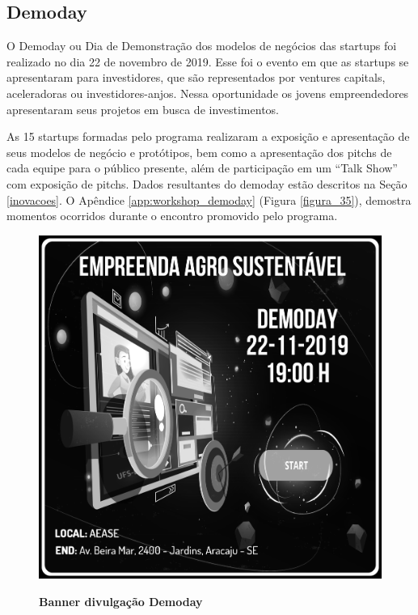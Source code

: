 \subsection{Demoday}

O Demoday ou Dia de Demonstração dos modelos de negócios das startups foi realizado no dia 22 de novembro de 2019. Esse foi o evento em que as startups se apresentaram para investidores, que são representados por ventures capitals, aceleradoras ou investidores-anjos. Nessa oportunidade os jovens empreendedores apresentaram seus projetos em busca de investimentos. 

As 15 startups formadas pelo programa realizaram a exposição e apresentação de seus modelos de negócio e protótipos, bem como a apresentação dos pitchs de cada equipe para o público presente, além de participação em um “Talk Show” com exposição de pitchs. Dados resultantes do demoday estão descritos na Seção \ref{inovacoes}. 
O Apêndice \ref{app:workshop_demoday} (Figura \ref{figura_35}), demostra momentos ocorridos durante o encontro promovido pelo programa.



\begin{figure}[H]
\centering
\caption{\textbf{Banner divulgação Demoday}}
\includegraphics[scale=0.1]{Imagens/demoday_banner.png}
\label{fig:ods}
\end{figure}


